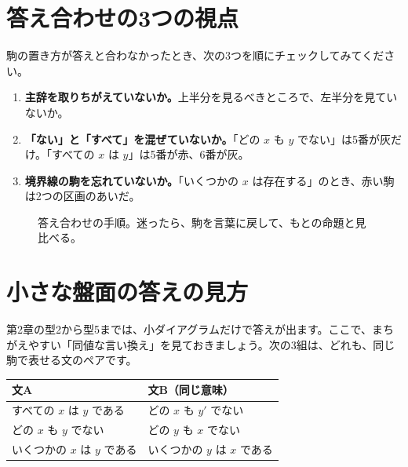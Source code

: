 \documentclass[a4paper,11pt,openany]{ltjsbook}
\begin{document}
\section{答え合わせの3つの視点}

駒の置き方が答えと合わなかったとき、次の3つを順にチェックしてみてください。

\begin{enumerate}[leftmargin=2em]
\item \textbf{主辞を取りちがえていないか。}上半分を見るべきところで、左半分を見ていないか。
\item \textbf{「ない」と「すべて」を混ぜていないか。}「どの $x$ も $y$ でない」は5番が灰だけ。「すべての $x$ は $y$」は5番が赤、6番が灰。
\item \textbf{境界線の駒を忘れていないか。}「いくつかの $x$ は存在する」のとき、赤い駒は2つの区画のあいだ。

\end{enumerate}

\begin{figure}[htbp]
\centering
{}
\caption{答え合わせの手順。迷ったら、駒を言葉に戻して、もとの命題と見比べる。}
\end{figure}

\section{小さな盤面の答えの見方}

第2章の型2から型5までは、小ダイアグラムだけで答えが出ます。ここで、まちがえやすい「同値な言い換え」を見ておきましょう。次の3組は、どれも、同じ駒で表せる文のペアです。

\begin{center}
\begin{tabular}{p{5.6cm}p{5.6cm}}
\toprule
文A & 文B（同じ意味）\\
\midrule
すべての $x$ は $y$ である & どの $x$ も $y'$ でない\\
どの $x$ も $y$ でない & どの $y$ も $x$ でない\\
いくつかの $x$ は $y$ である & いくつかの $y$ は $x$ である\\
\bottomrule
\end{tabular}
\end{center}
\end{document}

